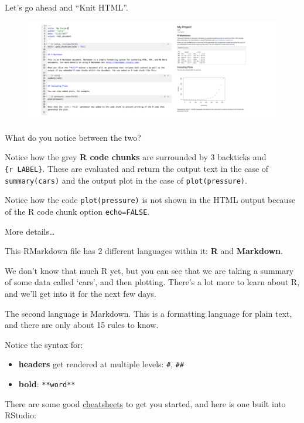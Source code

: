 \documentclass[]{book}
\providecommand{\tightlist}{%
  \setlength{\itemsep}{0pt}\setlength{\parskip}{0pt}}
\theoremstyle{definition}
\theoremstyle{definition}
\theoremstyle{definition}
\theoremstyle{remark}
\begin{document}
Let's go ahead and ``Knit HTML''.

\begin{figure}[htbp]
\centering
\includegraphics{img/rmarkdown_side_by_side.png}
\caption{}
\end{figure}

What do you notice between the two?

Notice how the grey \textbf{R code chunks} are surrounded by 3 backticks
and \texttt{\{r\ LABEL\}}. These are evaluated and return the output
text in the case of \texttt{summary(cars)} and the output plot in the
case of \texttt{plot(pressure)}.

Notice how the code \texttt{plot(pressure)} is not shown in the HTML
output because of the R code chunk option \texttt{echo=FALSE}.

More details\ldots{}

This RMarkdown file has 2 different languages within it: \textbf{R} and
\textbf{Markdown}.

We don't know that much R yet, but you can see that we are taking a
summary of some data called `cars', and then plotting. There's a lot
more to learn about R, and we'll get into it for the next few days.

The second language is Markdown. This is a formatting language for plain
text, and there are only about 15 rules to know.

Notice the syntax for:

\begin{itemize}
\tightlist
\item
  \textbf{headers} get rendered at multiple levels: \texttt{\#},
  \texttt{\#\#}
\item
  \textbf{bold}: \texttt{**word**}
\end{itemize}

There are some good
\href{https://github.com/adam-p/markdown-here/wiki/Markdown-Here-Cheatsheet}{cheatsheets}
to get you started, and here is one built into RStudio:
\end{document}
